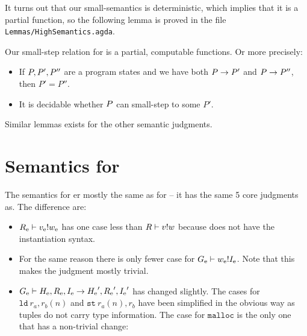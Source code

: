 It turns out that our small-semantics is deterministic, which implies that it is
a partial function, so the following lemma is proved in the file
\texttt{Lemmas/HighSemantics.agda}.

\begin{lemma}
  \label{lemma:computhigh}
  Our small-step relation for \ATAL is a partial, computable functions. Or more
  precisely:

  \begin{itemize}
  \item If $P, P', P''$ are a program states and we have both
    ${P} -> {P'}$ and ${P} -> {P''}$, then
    $P' = P''$.
  \item It is decidable whether $P$ can small-step to some $P'$.
  \end{itemize}

  Similar lemmas exists for the other semantic judgments.
\end{lemma}

\section{Semantics for \ATALe}

The semantics for \ATALe er mostly the same as for \ATAL -- it has the same 5
core judgments as. The difference are:

\begin{itemize}
\item ${{{R}_{\mathrm{e}}}} |- {{{v}_{\mathrm{e}}}} ! {{{w}_{\mathrm{e}}}}$ has one case less than
  ${R} |- {v} ! {w}$ because \ATALe does not have the
  instantiation syntax.
\item For the same reason there is only fewer case for
  ${{{G}_{\mathrm{e}}}} |- {{{w}_{\mathrm{e}}}} ! {{{I}_{\mathrm{e}}}}$. Note that this makes the
  judgment mostly trivial.
\item
  ${{{G}_{\mathrm{e}}}} |- {{{H}_{\mathrm{e}}}, {{R}_{\mathrm{e}}}, {{I}_{\mathrm{e}}}} -> {{{H}_{\mathrm{e}}}', {{R}_{\mathrm{e}}}',
    {{I}_{\mathrm{e}}}'}$ has changed slightly. The cases for $\mathtt{ld}\ r_a, r_b(n)$
  and $\mathtt{st}\ r_a(n), r_b$ have been simplified in the obvious way as
  tuples do not carry type information. The case for $\mathtt{malloc}$ is the
  only one that has a non-trivial change:
\end{itemize}


